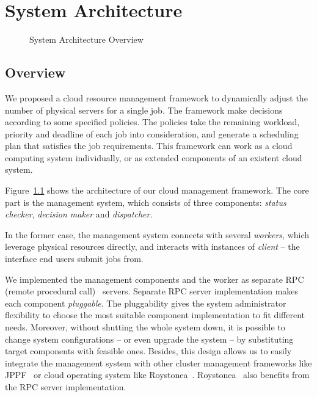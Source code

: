 \chapter{System Architecture}

\begin{figure}[h]
  \centering
  
  \caption{System Architecture Overview}
  \label{fig:archi-overview}
\end{figure}

\section{Overview}

We proposed a cloud resource management framework to dynamically adjust
the number of physical servers for a single job.
The framework make decisions according to some specified policies.
The policies take the remaining workload, priority and deadline of each
job into consideration, and generate a scheduling plan that satisfies
the job requirements.
This framework can work as a cloud computing system individually, or as
extended components of an existent cloud system.

Figure~\ref{fig:archi-overview} shows the architecture of our cloud
management framework.
The core part is the management system, which consists of three
components: \emph{status checker}, \emph{decision maker} and
\emph{dispatcher}.

In the former case, the management system connects with several
\emph{workers}, which leverage physical resources directly, and
interacts with instances of \emph{client} -- the interface end users
submit jobs from.

We implemented the management components and the worker as separate RPC
(remote procedural call)~\cite{cite:RPC} servers.
Separate RPC server implementation makes each component
\emph{pluggable}.
The pluggability gives the system administrator flexibility to choose
the most suitable component implementation to fit different needs.
Moreover, without shutting the whole system down, it is possible to
change system configurations -- or even upgrade the system -- by
substituting target components with feasible ones.
Besides, this design allows us to easily integrate the management system
with other cluster management frameworks like JPPF~\cite{cite:JPPF} or
cloud operating system like Roystonea~\cite{cite:roystonea}.
Roystonea~\cite{cite:roystonea} also benefits from the RPC server
implementation.


